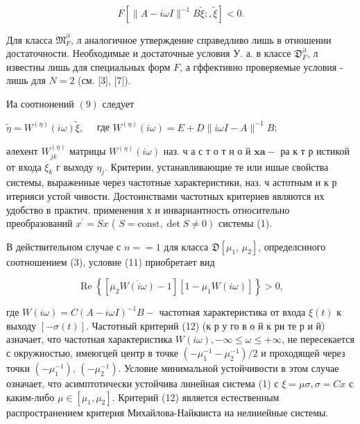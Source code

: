 \documentclass[10pt]{article}
\begin{document}
\[

F\left[\|A-i \omega I\|^{-1} B \tilde{\xi} ;, \tilde{\xi}\right]<0 .

\]



Для класса $\mathfrak{M}_{F}^{\partial}$, л аналогичное утверждение справедливо лишь в отношении достаточности. Необходимые и достаточные условия $У$. а. в классе $\mathfrak{D}_{F}^{\partial}$, л известны лишь для специальных форм $F$, а гффективно проверяемые условия - лишь для $N=2$ (см. [3], [7]).



Иа соотнонений $(9)$ следует



$\tilde{\eta}=W^{(\eta)}(i \omega) \tilde{\xi}, \quad$ где $W^{(\eta)}(i \omega)=E+D\|i \omega I-A\|^{-1} B$;



әлехент $W_{j k}^{(\eta)}$ матрицы $W^{(\eta)}(i \omega)$ наз. ч а с т о т н о й $\mathbf{x} \mathbf{a}-$ ра к т р истикой от входа $\xi_{k}$ г выходу $\eta_{j}$. Критерии, устанавливающие те или ишые свойства системы, выраженные через частотные характеристики, наз. ч астотным и к р итерияси устой чивости. Достоинствами частотных критериев являются их удобство в практич. применения х и инвариантность относительно преобразований $x^{\prime}=S x$ ( $\left.S=\mathrm{const}, \operatorname{det} S \neq 0\right)$ системы (1).



В действительном случае с $n==1$ для класса $\mathfrak{D}\left[\mu_{1}\right.$, $\left.\mu_{2}\right]$, определснного соотношением (3), условие (11) приобретает вид



\[

\operatorname{Re}\left\{\left[\mu_{2} \overline{W(i \omega)}-1\right]\left[1-\mu_{1} W(i \omega)\right]\right\}>0,

\]



где $W(i \omega)=C(A-i \omega I)^{-1} B-$ частотная характеристика от входа $\xi(t)$ к выходу $[-\sigma(t)]$. Частотный критерий (12) (к р у го в о й к ри те р и й) азначает, что частотная характеристика $W(i \omega),-\infty \leqslant \omega \leqslant+\infty$, не пересекается с окружностью, имеюгцей центр в точке $\left(-\mu_{1}^{-1}-\mu_{2}^{-1}\right) / 2$ и проходящей через точки $\left(-\mu_{1}^{-1}\right)$, $\left(-\mu_{2}^{-1}\right)$. Условие минимальной устойчивости в этом случае означает, что асимптотически устойчива линейная система (1) с $\xi=\mu \sigma, \sigma=C x$ с каким-либо $\mu \in\left[\mu_{1}, \mu_{2}\right]$. Критерий (12) является естественным распространением критерия Михайлова-Найквиста на нелинейные системы.
\end{document}
